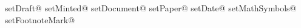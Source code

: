  \def\setFootnoteMark@numbers{\footnotesymbolsfalse}
  \def\setFootnoteMark@symbols{\footnotesymbolstrue}

  \def\setMinted@yes{%
    \mintedtrue%
    \gdef\MintedOption{minted}%
  }
  \def\setMinted@no{%
    \mintedfalse%
    \gdef\MintedOption{}%
  }

  \newcommand{\setup}[7]{%
    \csname setDraft@#1\endcsname%
    \csname setMinted@#2\endcsname%
    \csname setDocument@#3\endcsname%
    \csname setPaper@#4\endcsname%
    \csname setDate@#5\endcsname%
    \csname setMathSymbols@#6\endcsname%
    \csname setFootnoteMark@#7\endcsname%
  }
\makeatother

\setup{\optDraft}{\optMinted}{\optType}{\optPaper}{\optDate}{\optMathSymbols}{\optFootnoteMark}

